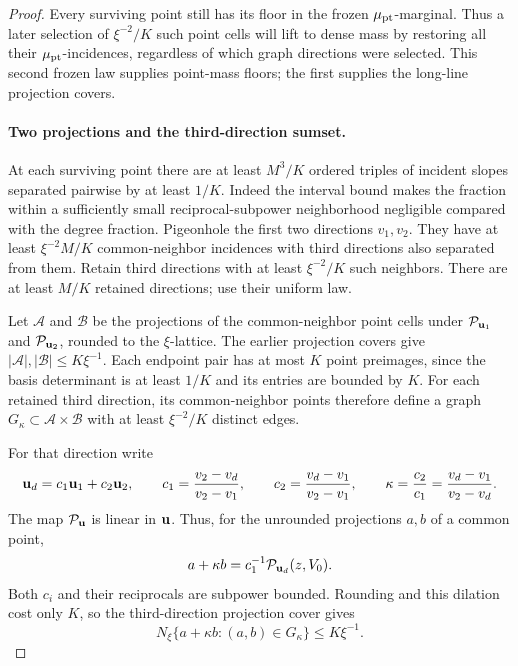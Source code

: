 \begin{proof}
Every surviving point still has its floor in the frozen
\(\mu_{\rm pt}\)-marginal.  Thus a later selection of
\(\xi^{-2}/K\) such point cells will lift to dense mass by
restoring all their \(\mu_{\rm pt}\)-incidences, regardless
of which graph directions were selected.  This second frozen law
supplies point-mass floors; the first supplies the long-line
projection covers.

\paragraph{Two projections and the third-direction sumset.}
At each surviving point there are at least \(M^3/K\) ordered
triples of incident slopes separated pairwise by at least
\(1/K\).  Indeed the interval bound makes the fraction within
a sufficiently small reciprocal-subpower neighborhood negligible
compared with the degree fraction.  Pigeonhole the first two
directions \(v_1,v_2\).  They have at least
\(\xi^{-2}M/K\) common-neighbor incidences with third
directions also separated from them.  Retain third directions with
at least \(\xi^{-2}/K\) such neighbors.  There are at least
\(M/K\) retained directions; use their uniform law.

Let \(\mathcal A\) and \(\mathcal B\) be the projections of
the common-neighbor point cells under
\(\mathcal P_{{\bf u}_1}\) and \(\mathcal P_{{\bf u}_2}\),
rounded to the \(\xi\)-lattice.  The earlier projection covers
give \(|\mathcal A|,|\mathcal B|\le K\xi^{-1}\).
Each endpoint pair has at most \(K\) point preimages, since
the basis determinant is at least \(1/K\) and its entries are
bounded by \(K\).  For each retained third direction, its
common-neighbor points therefore define a graph
\(G_\kappa\subset\mathcal A\times\mathcal B\) with at least
\(\xi^{-2}/K\) distinct edges.

For that direction write
\[
 {\bf u}_d=c_1{\bf u}_1+c_2{\bf u}_2,\qquad
 c_1=\frac{v_2-v_d}{v_2-v_1},\qquad
 c_2=\frac{v_d-v_1}{v_2-v_1},\qquad
 \kappa=\frac{c_2}{c_1}=\frac{v_d-v_1}{v_2-v_d}.
\]
The map \(\mathcal P_{\bf u}\) is linear in \({\bf u}\).
Thus, for the unrounded projections \(a,b\) of a common point,
\[
 a+\kappa b=c_1^{-1}\mathcal P_{{\bf u}_d}(z,V_0).
\]
Both \(c_i\) and their reciprocals are subpower bounded.
Rounding and this dilation cost only \(K\), so the third-direction
projection cover gives
\[
 N_\xi\{a+\kappa b:(a,b)\in G_\kappa\}
       \le K\xi^{-1}.
\]


\end{proof}
